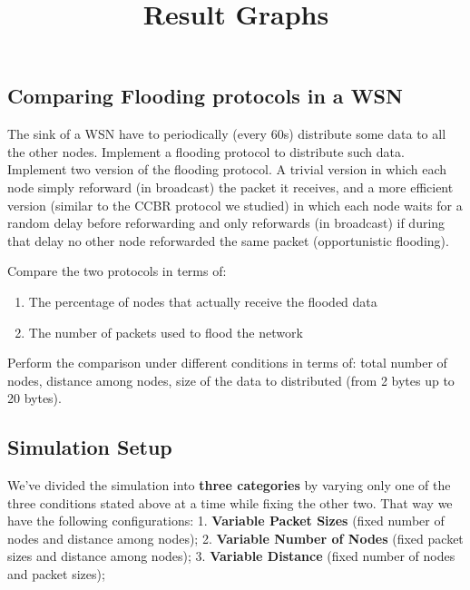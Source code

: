 \documentclass[11pt]{article}
\title{Result Graphs}
\providecommand{\tightlist}{%
      \setlength{\itemsep}{0pt}\setlength{\parskip}{0pt}}
\begin{document}
    
    
    \maketitle
    
    

    
    \hypertarget{comparing-flooding-protocols-in-a-wsn}{%
\subsection{Comparing Flooding protocols in a
WSN}\label{comparing-flooding-protocols-in-a-wsn}}

The sink of a WSN have to periodically (every 60s) distribute some data
to all the other nodes. Implement a flooding protocol to distribute such
data. Implement two version of the flooding protocol. A trivial version
in which each node simply reforward (in broadcast) the packet it
receives, and a more efficient version (similar to the CCBR protocol we
studied) in which each node waits for a random delay before reforwarding
and only reforwards (in broadcast) if during that delay no other node
reforwarded the same packet (opportunistic flooding).

Compare the two protocols in terms of:

\begin{enumerate}
\def\labelenumi{\arabic{enumi}.}
\tightlist
\item
  The percentage of nodes that actually receive the flooded data
\item
  The number of packets used to flood the network
\end{enumerate}

Perform the comparison under different conditions in terms of: total
number of nodes, distance among nodes, size of the data to distributed
(from 2 bytes up to 20 bytes).

    \hypertarget{simulation-setup}{%
\subsection{Simulation Setup}\label{simulation-setup}}

We've divided the simulation into \textbf{three categories} by varying
only one of the three conditions stated above at a time while fixing the
other two. That way we have the following configurations: 1.
\textbf{Variable Packet Sizes} (fixed number of nodes and distance among
nodes); 2. \textbf{Variable Number of Nodes} (fixed packet sizes and
distance among nodes); 3. \textbf{Variable Distance} (fixed number of
nodes and packet sizes);
\end{document}
